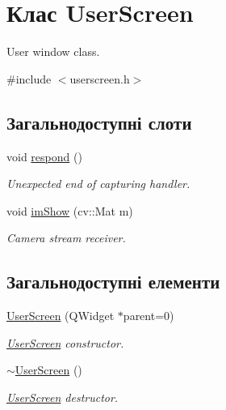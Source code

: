\hypertarget{classUserScreen}{\section{Клас User\-Screen}
\label{classUserScreen}
}


User window class.  




{\ttfamily \#include $<$userscreen.\-h$>$}

\subsection*{Загальнодоступні слоти}
\begin{DoxyCompactItemize}
\item 
\hypertarget{classUserScreen_a89419eeb0d30311360c816f2a29355df}{void \hyperlink{classUserScreen_a89419eeb0d30311360c816f2a29355df}{respond} ()}\label{classUserScreen_a89419eeb0d30311360c816f2a29355df}

\begin{DoxyCompactList}\small\item\em Unexpected end of capturing handler. \end{DoxyCompactList}\item 
\hypertarget{classUserScreen_a960593e46a29dde2ebecde6bced1eaf9}{void \hyperlink{classUserScreen_a960593e46a29dde2ebecde6bced1eaf9}{im\-Show} (cv\-::\-Mat m)}\label{classUserScreen_a960593e46a29dde2ebecde6bced1eaf9}

\begin{DoxyCompactList}\small\item\em Camera stream receiver. \end{DoxyCompactList}\end{DoxyCompactItemize}
\subsection*{Загальнодоступні елементи}
\begin{DoxyCompactItemize}
\item 
\hyperlink{classUserScreen_a27136456b8f1b4d10dfe1cbfc9c43d7c}{User\-Screen} (Q\-Widget $\ast$parent=0)
\begin{DoxyCompactList}\small\item\em \hyperlink{classUserScreen}{User\-Screen} constructor. \end{DoxyCompactList}\item 
\hypertarget{classUserScreen_a30ef13619f5f42c72064ccd57df79e82}{\hyperlink{classUserScreen_a30ef13619f5f42c72064ccd57df79e82}{$\sim$\-User\-Screen} ()}\label{classUserScreen_a30ef13619f5f42c72064ccd57df79e82}

\begin{DoxyCompactList}\small\item\em \hyperlink{classUserScreen}{User\-Screen} destructor. \end{DoxyCompactList}\end{DoxyCompactItemize}
